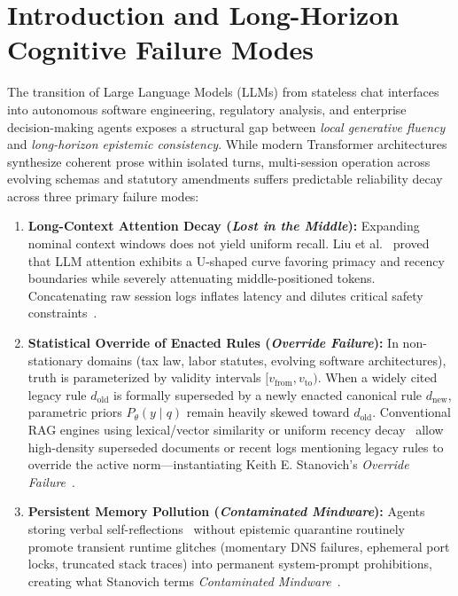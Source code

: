 \documentclass[10pt,twocolumn]{article}
\begin{document}
\section{Introduction and Long-Horizon Cognitive Failure Modes}

The transition of Large Language Models (LLMs) from stateless chat interfaces into autonomous software engineering, regulatory analysis, and enterprise decision-making agents exposes a structural gap between \emph{local generative fluency} and \emph{long-horizon epistemic consistency}. While modern Transformer architectures synthesize coherent prose within isolated turns, multi-session operation across evolving schemas and statutory amendments suffers predictable reliability decay across three primary failure modes:

\begin{enumerate}[leftmargin=*,nosep,itemsep=2pt]
    \item \textbf{Long-Context Attention Decay (\emph{Lost in the Middle}):} Expanding nominal context windows does not yield uniform recall. Liu et al.~\cite{E03} proved that LLM attention exhibits a U-shaped curve favoring primacy and recency boundaries while severely attenuating middle-positioned tokens. Concatenating raw session logs inflates latency and dilutes critical safety constraints~\cite{E01,E02,E04}.
    \item \textbf{Statistical Override of Enacted Rules (\emph{Override Failure}):} In non-stationary domains (tax law, labor statutes, evolving software architectures), truth is parameterized by validity intervals $[v_{\mathrm{from}}, v_{\mathrm{to}})$. When a widely cited legacy rule $d_{\mathrm{old}}$ is formally superseded by a newly enacted canonical rule $d_{\mathrm{new}}$, parametric priors $P_{\theta}(y \mid q)$ remain heavily skewed toward $d_{\mathrm{old}}$. Conventional RAG engines using lexical/vector similarity or uniform recency decay~\cite{E08} allow high-density superseded documents or recent logs mentioning legacy rules to override the active norm---instantiating Keith E. Stanovich's \emph{Override Failure}~\cite{E20,E21}.
    \item \textbf{Persistent Memory Pollution (\emph{Contaminated Mindware}):} Agents storing verbal self-reflections~\cite{E18} without epistemic quarantine routinely promote transient runtime glitches (momentary DNS failures, ephemeral port locks, truncated stack traces) into permanent system-prompt prohibitions, creating what Stanovich terms \emph{Contaminated Mindware}~\cite{E20,E22}.
\end{enumerate}
\end{document}
